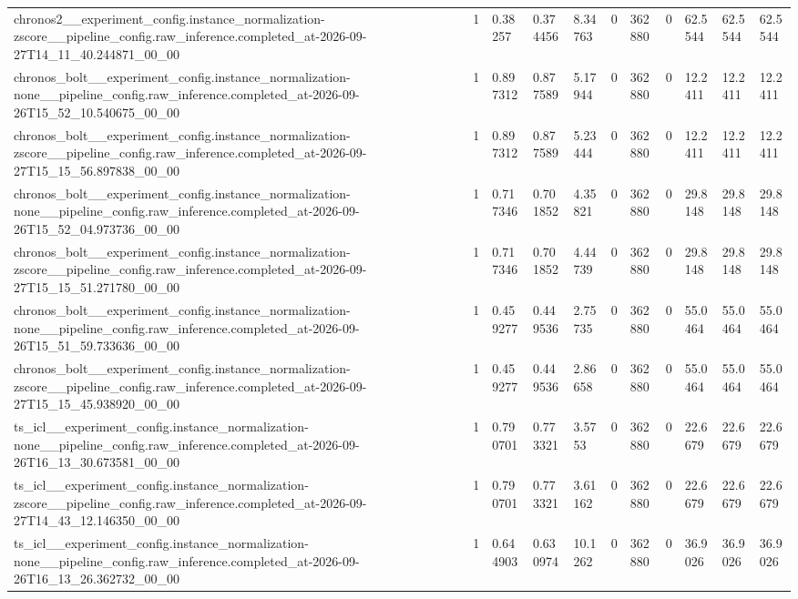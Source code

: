 \begin{tabular}{lllllllllll}
chronos2\_\_experiment\_config.instance\_normalization-zscore\_\_pipeline\_config.raw\_inference.completed\_at-2026-09-27T14\_11\_40.244871\_00\_00 & 1 & 0.38257 & 0.374456 & 8.34763 & 0 & 362880 & 0 & 62.5544 & 62.5544 & 62.5544 \\
chronos\_bolt\_\_experiment\_config.instance\_normalization-none\_\_pipeline\_config.raw\_inference.completed\_at-2026-09-26T15\_52\_10.540675\_00\_00 & 1 & 0.897312 & 0.877589 & 5.17944 & 0 & 362880 & 0 & 12.2411 & 12.2411 & 12.2411 \\
chronos\_bolt\_\_experiment\_config.instance\_normalization-zscore\_\_pipeline\_config.raw\_inference.completed\_at-2026-09-27T15\_15\_56.897838\_00\_00 & 1 & 0.897312 & 0.877589 & 5.23444 & 0 & 362880 & 0 & 12.2411 & 12.2411 & 12.2411 \\
chronos\_bolt\_\_experiment\_config.instance\_normalization-none\_\_pipeline\_config.raw\_inference.completed\_at-2026-09-26T15\_52\_04.973736\_00\_00 & 1 & 0.717346 & 0.701852 & 4.35821 & 0 & 362880 & 0 & 29.8148 & 29.8148 & 29.8148 \\
chronos\_bolt\_\_experiment\_config.instance\_normalization-zscore\_\_pipeline\_config.raw\_inference.completed\_at-2026-09-27T15\_15\_51.271780\_00\_00 & 1 & 0.717346 & 0.701852 & 4.44739 & 0 & 362880 & 0 & 29.8148 & 29.8148 & 29.8148 \\
chronos\_bolt\_\_experiment\_config.instance\_normalization-none\_\_pipeline\_config.raw\_inference.completed\_at-2026-09-26T15\_51\_59.733636\_00\_00 & 1 & 0.459277 & 0.449536 & 2.75735 & 0 & 362880 & 0 & 55.0464 & 55.0464 & 55.0464 \\
chronos\_bolt\_\_experiment\_config.instance\_normalization-zscore\_\_pipeline\_config.raw\_inference.completed\_at-2026-09-27T15\_15\_45.938920\_00\_00 & 1 & 0.459277 & 0.449536 & 2.86658 & 0 & 362880 & 0 & 55.0464 & 55.0464 & 55.0464 \\
ts\_icl\_\_experiment\_config.instance\_normalization-none\_\_pipeline\_config.raw\_inference.completed\_at-2026-09-26T16\_13\_30.673581\_00\_00 & 1 & 0.790701 & 0.773321 & 3.5753 & 0 & 362880 & 0 & 22.6679 & 22.6679 & 22.6679 \\
ts\_icl\_\_experiment\_config.instance\_normalization-zscore\_\_pipeline\_config.raw\_inference.completed\_at-2026-09-27T14\_43\_12.146350\_00\_00 & 1 & 0.790701 & 0.773321 & 3.61162 & 0 & 362880 & 0 & 22.6679 & 22.6679 & 22.6679 \\
ts\_icl\_\_experiment\_config.instance\_normalization-none\_\_pipeline\_config.raw\_inference.completed\_at-2026-09-26T16\_13\_26.362732\_00\_00 & 1 & 0.644903 & 0.630974 & 10.1262 & 0 & 362880 & 0 & 36.9026 & 36.9026 & 36.9026 \\

\end{tabular}
